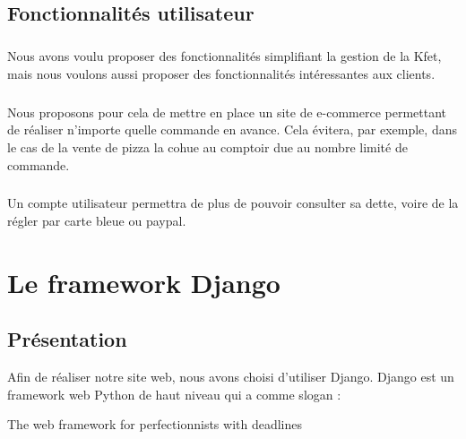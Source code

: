 \documentclass[twoside,UTF8]{EPURapport}
\begin{document}
    \section{Fonctionnalités utilisateur}

        \paragraph{}Nous avons voulu proposer des fonctionnalités simplifiant la gestion de la Kfet, mais nous voulons aussi proposer des fonctionnalités intéressantes aux clients.

        \paragraph{}Nous proposons pour cela de mettre en place un site de e-commerce permettant de réaliser n'importe quelle commande en avance. Cela évitera, par exemple, dans le cas de la vente de pizza la cohue au comptoir due au nombre limité de commande.

        \paragraph{}Un compte utilisateur permettra de plus de pouvoir consulter sa dette, voire de la régler par carte bleue ou paypal.

\chapter{Le framework Django}

\section{Présentation}
Afin de réaliser notre site web, nous avons choisi d'utiliser Django. Django est un framework web Python de haut niveau
qui a comme slogan :\\
\begin{center}
    \begin{LARGE}
    The web framework for perfectionnists with deadlines
    \end{LARGE}
\end{center}
\end{document}
